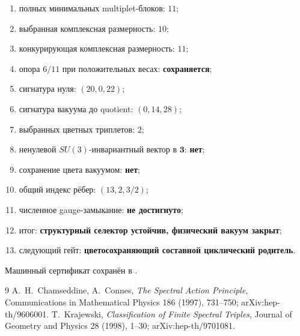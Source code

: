 \begin{protocol}
\begin{enumerate}
 \item полных минимальных multiplet-блоков: \textbf{$11$};
 \item выбранная комплексная размерность: \textbf{$10$};
 \item конкурирующая комплексная размерность: \textbf{$11$};
 \item опора $6/11$ при положительных весах: \textbf{сохраняется};
 \item сигнатура нуля: \textbf{$(20,0,22)$};
 \item сигнатура вакуума до quotient: \textbf{$(0,14,28)$};
 \item выбранных цветных триплетов: \textbf{$2$};
 \item ненулевой $SU(3)$-инвариантный вектор в $\mathbf3$: \textbf{нет};
 \item сохранение цвета вакуумом: \textbf{нет};
 \item общий индекс рёбер: \textbf{$(13,2,3/2)$};
 \item численное gauge-замыкание: \textbf{не достигнуто};
 \item итог: \textbf{структурный селектор устойчив, физический вакуум закрыт};
 \item следующий гейт: \textbf{цветосохраняющий составной циклический
 родитель}.
\end{enumerate}
\end{protocol}

Машинный сертификат сохранён в
.

\begin{thebibliography}{9}
A.~H.~Chamseddine, A.~Connes,
\emph{The Spectral Action Principle},
Communications in Mathematical Physics 186 (1997), 731--750;
arXiv:hep-th/9606001.
T.~Krajewski,
\emph{Classification of Finite Spectral Triples},
Journal of Geometry and Physics 28 (1998), 1--30;
arXiv:hep-th/9701081.
\end{thebibliography}